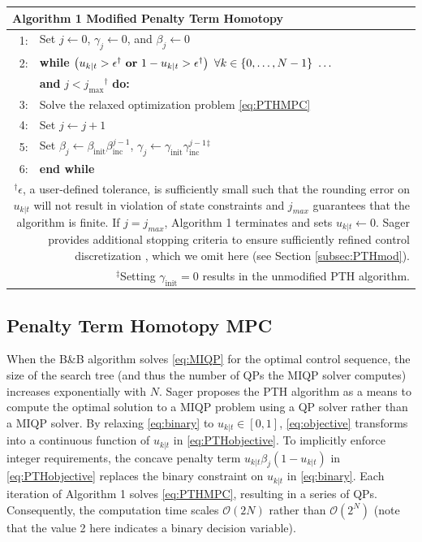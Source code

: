 \documentclass[journal,twoside,web]{ieeecolor}
\begin{document}
\begin{table}[b!]
\centering
\begin{tabular}{rl}
\toprule[2pt]
\multicolumn{2}{l}{\textbf{Algorithm 1} Modified Penalty Term Homotopy} \\ \midrule
1: & Set $j\leftarrow0$, $\gamma_j \leftarrow 0$, and $\beta_j \leftarrow 0$\\
2: & \textbf{while} $\left( u_{k|t} > \epsilon^\dagger ~ \textrm{\textbf{or}} ~ 1 - u_{k|t} > \epsilon^\dagger\right) ~\forall k \in \{0,\ldots,N-1\} ~\ldots$ \\
& \hspace{6mm} \textbf{and} $j < j_{\textrm{max}}{}^\dagger$ \textbf{do:} \\
3: & \hspace{3mm} Solve the relaxed optimization problem \eqref{eq:PTHMPC}\\
4: & \hspace{3mm} Set $j \leftarrow j+1$ \\
5: & \hspace{3mm} Set $\beta_j \leftarrow \beta_{\textrm{init}} \beta_{\textrm{inc}}^{j-1}$, $\gamma_j \leftarrow \gamma_{\textrm{init}} \gamma_{\textrm{inc}}^{j-1} {}^\ddagger$   \\
6: & \textbf{end while} \\
\bottomrule
\multicolumn{2}{p{230pt}}{$^\dagger \!\epsilon$, a user-defined tolerance, is sufficiently small such that the rounding error on $u_{k|t}$ will not result in violation of state constraints and $j_{max}$ guarantees that the algorithm is finite. If $j = j_{max}$, Algorithm 1 terminates and sets $u_{k|t} \leftarrow 0$. Sager provides additional stopping criteria to ensure sufficiently refined control discretization \cite{Sager2006}, which we omit here (see Section \ref{subsec:PTHmod}).}\\
\multicolumn{2}{p{230pt}}{$^\ddagger$Setting $\gamma_{\textrm{init}} = 0$ results in the unmodified PTH algorithm.}
\end{tabular}
\label{alg:PTH}
\end{table}

\subsection{Penalty Term Homotopy MPC}
\label{subsec:PTHQP}
When the B\&B algorithm solves \eqref{eq:MIQP} for the optimal control sequence, the size of the search tree (and thus the number of QPs the MIQP solver computes) increases exponentially with $N$. Sager \cite{Sager2006} proposes the PTH algorithm as a means to compute the optimal solution to a MIQP problem using a QP solver rather than a MIQP solver. By relaxing \eqref{eq:binary} to $u_{k|t} \in [0,1]$, \eqref{eq:objective} transforms into a continuous function of $u_{k|t}$ in \eqref{eq:PTHobjective}. To implicitly enforce integer requirements, the concave penalty term $u_{k|t}\beta_j(1-u_{k|t})$ in \eqref{eq:PTHobjective} replaces the binary constraint on $u_{k|t}$ in \eqref{eq:binary}. Each iteration of Algorithm 1 solves \eqref{eq:PTHMPC}, resulting in a series of QPs. Consequently, the computation time scales $\mathcal{O}(2N)$ rather than $\mathcal{O}(2^N)$ (note that the value 2 here indicates a binary decision variable).
\end{document}

